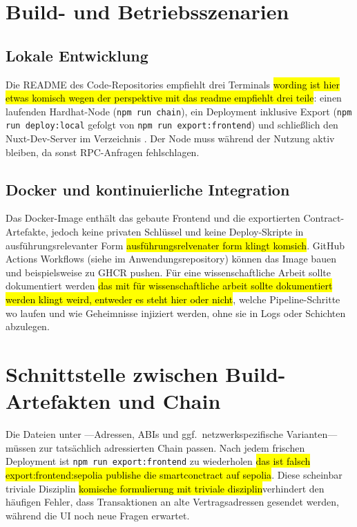 \section{Build- und Betriebsszenarien}

\subsection{Lokale Entwicklung}

Die README des Code-Repositories empfiehlt drei Terminals \hl{wording ist hier etwas komisch wegen der perspektive mit das readme empfiehlt drei teile}: einen laufenden
Hardhat-Node (\texttt{npm run chain}), ein Deployment inklusive Export
(\texttt{npm run deploy:local} gefolgt von \texttt{npm run export:frontend}) und
schließlich den Nuxt-Dev-Server im Verzeichnis . Der Node muss
während der Nutzung aktiv bleiben, da sonst RPC-Anfragen fehlschlagen.

\subsection{Docker und kontinuierliche Integration}

Das Docker-Image enthält das gebaute Frontend und die exportierten
Contract-Artefakte, jedoch keine privaten Schlüssel und keine Deploy-Skripte in
ausführungsrelevanter Form \hl{ausführungsrelvenater form klingt komsich}. GitHub Actions Workflows (siehe 
im Anwendungsrepository) können das Image bauen und beispielsweise zu GHCR
pushen. Für eine wissenschaftliche Arbeit sollte dokumentiert werden \hl{das mit für wissenschaftliche arbeit sollte dokumentiert werden klingt weird, entweder es steht hier oder nicht}, welche
Pipeline-Schritte wo laufen und wie Geheimnisse injiziert werden, ohne sie in
Logs oder Schichten abzulegen.

\section{Schnittstelle zwischen Build-Artefakten und Chain}

Die Dateien unter ---Adressen, ABIs und ggf.\
netzwerkspezifische Varianten---müssen zur tatsächlich adressierten Chain passen.
Nach jedem frischen Deployment ist \texttt{npm run export:frontend} zu wiederholen \hl{das ist falsch export:frontend:sepolia publishe die smartconctract auf sepolia}.
Diese scheinbar triviale Disziplin \hl{komische formulierung mit triviale disziplin}verhindert den häufigen Fehler, dass
Transaktionen an alte Vertragsadressen gesendet werden, während die UI noch neue
Fragen erwartet.
